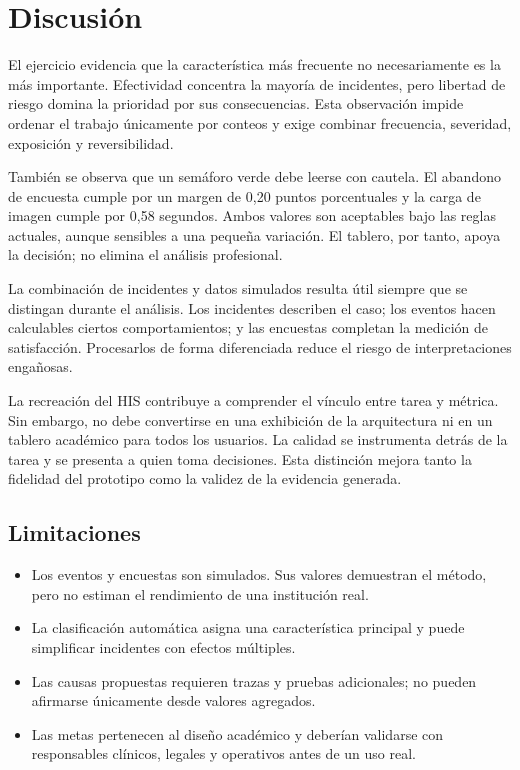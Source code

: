 \section{Discusión}

El ejercicio evidencia que la característica más frecuente no necesariamente es la más importante. Efectividad concentra la mayoría de incidentes, pero libertad de riesgo domina la prioridad por sus consecuencias. Esta observación impide ordenar el trabajo únicamente por conteos y exige combinar frecuencia, severidad, exposición y reversibilidad.

También se observa que un semáforo verde debe leerse con cautela. El abandono de encuesta cumple por un margen de 0,20 puntos porcentuales y la carga de imagen cumple por 0,58 segundos. Ambos valores son aceptables bajo las reglas actuales, aunque sensibles a una pequeña variación. El tablero, por tanto, apoya la decisión; no elimina el análisis profesional.

La combinación de incidentes y datos simulados resulta útil siempre que se distingan durante el análisis. Los incidentes describen el caso; los eventos hacen calculables ciertos comportamientos; y las encuestas completan la medición de satisfacción. Procesarlos de forma diferenciada reduce el riesgo de interpretaciones engañosas.

La recreación del HIS contribuye a comprender el vínculo entre tarea y métrica. Sin embargo, no debe convertirse en una exhibición de la arquitectura ni en un tablero académico para todos los usuarios. La calidad se instrumenta detrás de la tarea y se presenta a quien toma decisiones. Esta distinción mejora tanto la fidelidad del prototipo como la validez de la evidencia generada.

\subsection{Limitaciones}

\begin{itemize}
  \item Los eventos y encuestas son simulados. Sus valores demuestran el método, pero no estiman el rendimiento de una institución real.
  \item La clasificación automática asigna una característica principal y puede simplificar incidentes con efectos múltiples.
  \item Las causas propuestas requieren trazas y pruebas adicionales; no pueden afirmarse únicamente desde valores agregados.
  \item Las metas pertenecen al diseño académico y deberían validarse con responsables clínicos, legales y operativos antes de un uso real.
\end{itemize}

